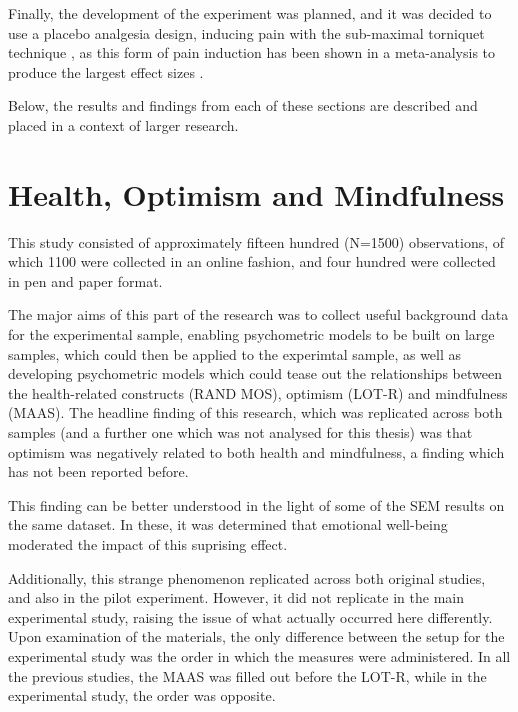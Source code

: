 Finally, the development of the experiment was planned, and it was decided to use a placebo analgesia design, inducing pain with the sub-maximal torniquet technique \cite{moore1979submaximal}, as this form of pain induction has been shown in a meta-analysis to produce the largest effect sizes \cite{Sauro2005}. 

Below, the results and findings from each of these sections are described and placed in a context of larger research. 

\section{Health, Optimism and Mindfulness}
\label{sec:health-optim-mindf}

This study consisted of approximately fifteen hundred (N=1500) observations, of which 1100 were collected in an online fashion, and four hundred were collected in pen and paper format. 

The major aims of this part of the research was to collect useful background data for the experimental sample, enabling psychometric models to be built on large samples, which could then be applied to the experimtal sample, as well as developing psychometric models which could tease out the relationships between the health-related constructs (RAND MOS), optimism (LOT-R) and mindfulness (MAAS). The headline finding of this research, which was replicated across both samples (and a further one which was not analysed for this thesis) was that optimism was negatively related to both health and mindfulness, a finding which has not been reported before. 

This finding can be better understood in the light of some of the SEM results on the same dataset. In these, it was determined that emotional well-being moderated the impact of this suprising effect. 


Additionally, this strange phenomenon replicated across both original studies, and also in the pilot experiment. However, it did not replicate in the main experimental study, raising the issue of what actually occurred here differently. Upon examination of the materials, the only difference between the setup for the experimental study was the order in which the measures were administered. In all the previous studies, the MAAS was filled out before the LOT-R, while in the experimental study, the order was opposite. 

